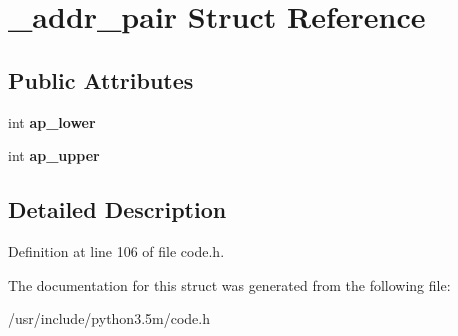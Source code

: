 \hypertarget{struct__addr__pair}{}\section{\+\_\+addr\+\_\+pair Struct Reference}
\label{struct__addr__pair}
\subsection*{Public Attributes}
\begin{DoxyCompactItemize}
\item 
int {\bfseries ap\+\_\+lower}\hypertarget{struct__addr__pair_a960425617377f631f14e81304a578238}{}\label{struct__addr__pair_a960425617377f631f14e81304a578238}

\item 
int {\bfseries ap\+\_\+upper}\hypertarget{struct__addr__pair_abfeb8a4b74168a0c24a9772b51b4bddb}{}\label{struct__addr__pair_abfeb8a4b74168a0c24a9772b51b4bddb}

\end{DoxyCompactItemize}


\subsection{Detailed Description}


Definition at line 106 of file code.\+h.



The documentation for this struct was generated from the following file\+:\begin{DoxyCompactItemize}
\item 
/usr/include/python3.\+5m/code.\+h\end{DoxyCompactItemize}
